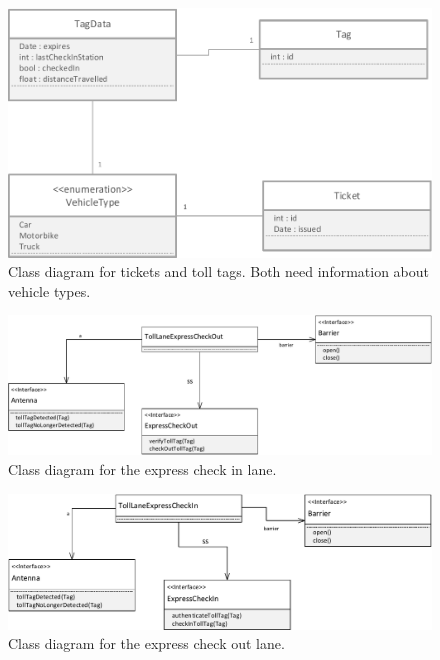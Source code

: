 \begin{figure}[H]
\centerline{\includegraphics[width=\textwidth]{img/class_diagram/class_diagram_Tag_Ticket_VehicleType}}
\caption{Class diagram for tickets and toll tags. Both need information about vehicle types.}
\label{fig:cld_ttvt}
\end{figure}

\begin{figure}[H]
\centerline{\includegraphics[width=\textwidth]{img/class_diagram/class_diagram_toll_lane_express_check_in}}
\caption{Class diagram for the express check in lane.}
\label{fig:cld_tlei}
\end{figure}

\begin{figure}[H]
\centerline{\includegraphics[width=\textwidth]{img/class_diagram/class_diagram_toll_lane_express_check_out}}
\caption{Class diagram for the express check out lane.}
\label{fig:cld_tleo}
\end{figure}

